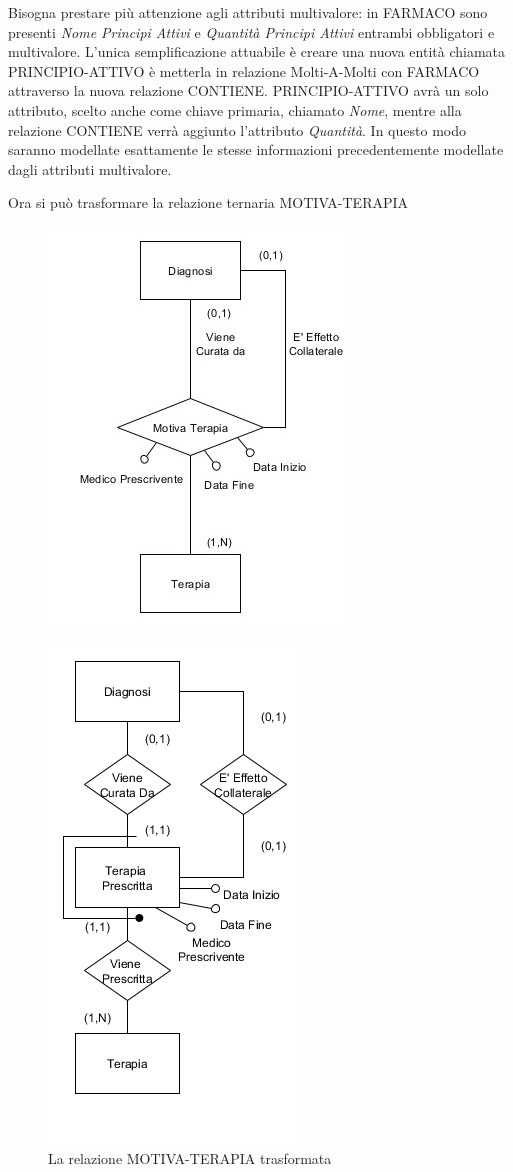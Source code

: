 \documentclass{article}
\begin{document}
Bisogna prestare più attenzione agli attributi multivalore:
in FARMACO sono presenti \textit{Nome Principi Attivi} e \textit{Quantità Principi Attivi} entrambi obbligatori e multivalore.
L'unica semplificazione attuabile è creare una nuova entità chiamata PRINCIPIO-ATTIVO è metterla in relazione Molti-A-Molti con FARMACO attraverso la nuova relazione CONTIENE.
PRINCIPIO-ATTIVO avrà un solo attributo, scelto anche come chiave primaria, chiamato \textit{Nome}, mentre alla relazione CONTIENE verrà aggiunto l'attributo \textit{Quantità}.
In questo modo saranno modellate esattamente le stesse informazioni precedentemente modellate dagli attributi multivalore.

Ora si può trasformare la relazione ternaria MOTIVA-TERAPIA

\begin{figure}[!ht] %
  \centering
  \includegraphics[width=.4\linewidth]{piccolo2}
\end{figure}
\begin{figure}[!ht] %
  \centering
  \includegraphics[width=.4\linewidth]{piccolo3}
  \caption{La relazione MOTIVA-TERAPIA trasformata}
  \label{piccolo3}
\end{figure}
\end{document}
